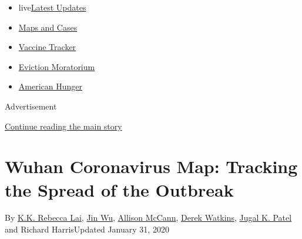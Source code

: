 \begin{itemize}
\tightlist
\item
  live\href{https://www.nytimes3xbfgragh.onion/2020/09/09/world/covid-19-coronavirus.html?name=styln-coronavirus-national\&region=TOP_BANNER\&block=storyline_menu_recirc\&action=click\&pgtype=Interactive\&impression_id=3c549b71-f298-11ea-a60b-cf7f5b4a6ae1\&variant=undefined}{Latest
  Updates}
\item
  \href{https://www.nytimes3xbfgragh.onion/interactive/2020/us/coronavirus-us-cases.html?name=styln-coronavirus-national\&region=TOP_BANNER\&block=storyline_menu_recirc\&action=click\&pgtype=Interactive\&impression_id=3c54c280-f298-11ea-a60b-cf7f5b4a6ae1\&variant=undefined}{Maps
  and Cases}
\item
  \href{https://www.nytimes3xbfgragh.onion/interactive/2020/science/coronavirus-vaccine-tracker.html?name=styln-coronavirus-national\&region=TOP_BANNER\&block=storyline_menu_recirc\&action=click\&pgtype=Interactive\&impression_id=3c54c281-f298-11ea-a60b-cf7f5b4a6ae1\&variant=undefined}{Vaccine
  Tracker}
\item
  \href{https://www.nytimes3xbfgragh.onion/2020/09/02/your-money/eviction-moratorium-covid.html?name=styln-coronavirus-national\&region=TOP_BANNER\&block=storyline_menu_recirc\&action=click\&pgtype=Interactive\&impression_id=3c54c282-f298-11ea-a60b-cf7f5b4a6ae1\&variant=undefined}{Eviction
  Moratorium}
\item
  \href{https://www.nytimes3xbfgragh.onion/interactive/2020/09/02/magazine/food-insecurity-hunger-us.html?name=styln-coronavirus-national\&region=TOP_BANNER\&block=storyline_menu_recirc\&action=click\&pgtype=Interactive\&impression_id=3c54c283-f298-11ea-a60b-cf7f5b4a6ae1\&variant=undefined}{American
  Hunger}
\end{itemize}

Advertisement

\protect\hyperlink{after-top}{Continue reading the main story}

\hypertarget{wuhan-coronavirus-map-tracking-the-spread-of-the-outbreak}{%
\section{Wuhan Coronavirus Map: Tracking the Spread of the
Outbreak}\label{wuhan-coronavirus-map-tracking-the-spread-of-the-outbreak}}

By \href{https://www.nytimes3xbfgragh.onion/by/kk-rebecca-lai}{K.K.
Rebecca Lai}, \href{https://www.nytimes3xbfgragh.onion/by/jin-wu}{Jin
Wu}, \href{https://www.nytimes3xbfgragh.onion/by/allison-mccann}{Allison
McCann},
\href{https://www.nytimes3xbfgragh.onion/by/derek-watkins}{Derek
Watkins},
\href{https://www.nytimes3xbfgragh.onion/by/jugal-k-patel}{Jugal K.
Patel} and Richard HarrisUpdated January 31, 2020

